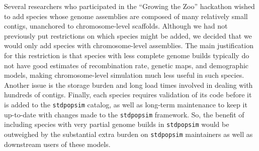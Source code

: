 \documentclass[hidelinks]{article}
\newcommand{\stdpopsim}{\texttt{stdpopsim}\xspace}
\begin{document}
Several researchers who participated in the ``Growing the Zoo'' hackathon wished to add species
whose genome assemblies are composed of many relatively small contigs,
unanchored to chromosome-level scaffolds.
Although we had not previously put restrictions on which species might be added,
we decided that we would only add species with chromosome-level assemblies.
%
The main justification for this restriction is that
species with less complete genome builds typically do not have good estimates of recombination rate, genetic maps, and demographic models,
making chromosome-level simulation much less useful in such species.
%
Another issue is the storage burden and long load times involved in dealing with
hundreds of contigs.
%
Finally, each species requires validation of its code before it is added to the \stdpopsim catalog,
as well as long-term maintenance to keep it up-to-date with changes made to the \stdpopsim framework.
So, the benefit of including species with very partial genome builds in \stdpopsim
would be outweighed by the substantial extra burden on \stdpopsim maintainers as well as
downstream users of these models.
\end{document}
